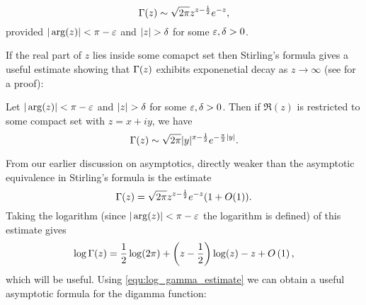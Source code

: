       \begin{theorem}
      \phantom{}
        \[
          \Gamma(z) \sim \sqrt{2\pi}z^{z-\frac{1}{2}}e^{-z},
        \]
        provided $|\arg(z)| < \pi-\varepsilon$ and $|z| > \delta$ for some $\varepsilon,\delta > 0$.
      \end{theorem}

      If the real part of $z$ lies inside some comapct set then Stirling's formula gives a useful estimate showing that $\Gamma(z)$ exhibits exponenetial decay as $z \to \infty$ (see \cite{remmert1998classical} for a proof):
      
      \begin{corollary}
      Let $|\arg(z)| < \pi-\varepsilon$ and $|z| > \delta$ for some $\varepsilon,\delta > 0$. Then if $\Re(z)$ is restricted to some compact set with $z = x+iy$, we have
        \[
          \Gamma(z) \sim \sqrt{2\pi}|y|^{x-\frac{1}{2}}e^{-\frac{\pi}{2}|y|}.
        \]
      \end{corollary}

      From our earlier discussion on asymptotics, directly weaker than the asymptotic equivalence in Stirling's formula is the estimate
      \begin{equation}\label{equ:weaker_Stirling_formula}
          \Gamma(z) = \sqrt{2\pi}z^{z-\frac{1}{2}}e^{-z}(1+O(1)).
      \end{equation}
      Taking the logarithm (since $|\arg(z)| < \pi-\varepsilon$ the logarithm is defined) of this estimate gives
      \begin{equation}\label{equ:log_gamma_estimate}
        \log\Gamma(z) = \frac{1}{2}\log(2\pi)+\left(z-\frac{1}{2}\right)\log(z)-z+O\left(1\right),
      \end{equation}
      which will be useful. Using \cref{equ:log_gamma_estimate} we can obtain a useful asymptotic formula for the digamma function:

